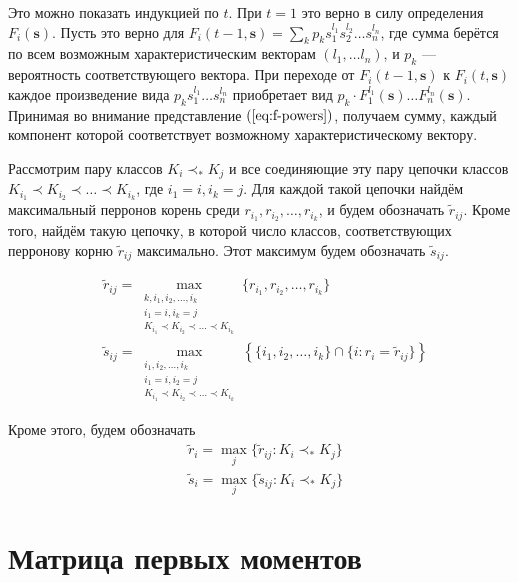 \documentclass[10pt]{article}
\begin{document}
Это можно показать индукцией по $t$. При $t = 1$ это верно в силу определения $F_i(\mathbf{s})$. Пусть это верно для $F_i(t-1, \mathbf{s}) = \sum_k p_k s_1^{l_1} s_2^{l_2} \ldots s_n^{l_n}$, где сумма берётся по всем возможным характеристическим векторам $(l_1, \ldots l_n)$, и $p_k$ --- вероятность соответствующего вектора. При переходе от $F_i(t-1, \mathbf{s})$ к $F_i(t, \mathbf{s})$ каждое произведение вида $p_k s_1^{l_1} \ldots s_n^{l_n}$ приобретает вид $p_k \cdot F_1^{l_1}(\mathbf{s}) \ldots F_n^{l_n}(\mathbf{s})$. Принимая во внимание представление $(\ref{eq:f-powers})$, получаем сумму, каждый компонент которой соответствует возможному характеристическому вектору.

Рассмотрим пару классов $K_i \prec_* K_j$ и все соединяющие эту пару цепочки классов $K_{i_1} \prec K_{i_2} \prec \ldots \prec K_{i_k}$, где $i_1 = i, i_k = j$. Для каждой такой цепочки найдём максимальный перронов корень среди $r_{i_1}, r_{i_2}, \ldots, r_{i_k}$, и будем обозначать $\tilde{r}_{ij}$. Кроме того, найдём такую цепочку, в которой число классов, соответствующих перронову корню $\tilde{r}_{ij}$ максимально. Этот максимум будем обозначать $\tilde{s}_{ij}$.

\begin{align}
\label{eq:trij}
    & \tilde{r}_{ij} = \max_{\substack{k, i_1, i_2, \ldots, i_k \\ i_1 = i, i_k = j \\ K_{i_1} \prec K_{i_2} \prec \ldots \prec K_{i_k}}} \{r_{i_1}, r_{i_2}, \ldots, r_{i_k}\} \\
\label{eq:tsij}
    & \tilde{s}_{ij} = \max_{\substack{i_1, i_2, \ldots, i_k \\ i_1 = i, i_2 = j \\ K_{i_1} \prec K_{i_2} \prec \ldots \prec K_{i_k}}} \left\{ \{ i_1, i_2, \ldots, i_k \} \cap \{ i : r_i = \tilde{r}_{ij} \} \right\}
\end{align}

Кроме этого, будем обозначать
\begin{align}
\label{eq:tri}
    & \tilde{r}_i = \max_j \{ \tilde{r}_{ij} : K_i \prec_* K_j \} \\
\label{eq:tsi}
    & \tilde{s}_i = \max_j \{ \tilde{s}_{ij} : K_i \prec_* K_j \}
\end{align}


\section{Матрица первых моментов}
\end{document}

